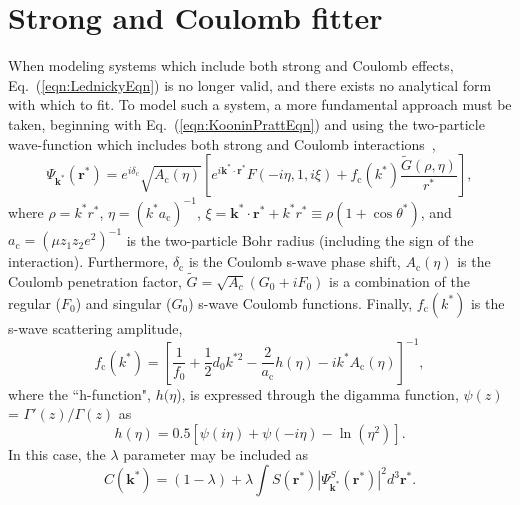 \documentclass[ALICE,manyauthors]{cernphprep}
\begin{document}
\section{Strong and Coulomb fitter}
\label{App:CoulombFitter}

When modeling systems which include both strong and Coulomb effects, Eq.~{\color{blue}(}\ref{eqn:LednickyEqn}{\color{blue})} is no longer valid, and there exists no analytical form with which to fit.
To model such a system, a more fundamental approach must be taken, beginning with Eq.~{\color{blue}(}\ref{eqn:KooninPrattEqn}{\color{blue})} and using the two-particle wave-function which includes both strong and Coulomb interactions~\cite{Lednicky:2005tb},
\begin{equation}
 \Psi_{\mathbf{k^{*}}}(\mathbf{r^{*}}) = e^{i\delta_{\mathrm{c}}}\sqrt{A_{\mathrm{c}}(\eta)}[e^{i\mathbf{k^{*}} \cdot \mathbf{r^{*}}}F(-i\eta,1,i\xi) + f_{\mathrm{c}}(k^{*})\frac{\tilde{G}(\rho,\eta)}{r^{*}}],
\label{eqn:CoulombWaveFcn}
\end{equation}
where $\rho = k^{*}r^{*}$, $\eta = (k^{*}a_{\mathrm{c}})^{-1}$, $\xi = \mathbf{k^{*}} \cdot \mathbf{r^{*}} + k^{*}r^{*} \equiv \rho(1+\cos\theta^{*})$, and $a_{\mathrm{c}} = (\mu z_{1}z_{2}e^{2})^{-1}$ is the two-particle Bohr radius (including the sign of the interaction).  
Furthermore, $\delta_{\mathrm{c}}$ is the Coulomb s-wave phase shift, $A_{\mathrm{c}}(\eta)$ is the Coulomb penetration factor, $\tilde{G} = \sqrt{A_{c}}(G_{0} + iF_{0})$ is a combination of the regular ($F_{0}$) and singular ($G_{0}$) s-wave Coulomb functions.  
Finally, $f_{\mathrm{c}}(k^{*})$ is the s-wave scattering amplitude,
\begin{equation}
 f_{\mathrm{c}}(k^{*}) = \left[\frac{1}{f_{0}} + \frac{1}{2}d_{0}k^{*2} - \frac{2}{a_{\mathrm{c}}}h(\eta) - ik^{*}A_{\mathrm{c}}(\eta)\right]^{-1},
\label{eqn:CoulombScattAmp}
\end{equation}
where the ``h-function", $h(\eta$), is expressed through the digamma function, $\psi(z)$ = $\Gamma'(z)/\Gamma(z)$ as
\begin{equation}
 h(\eta) = 0.5[\psi(i\eta) + \psi(-i\eta) - \ln(\eta^{2})].
\label{eqn:LednickyHFunction}
\end{equation} 
In this case, the $\lambda$ parameter may be included as
\begin{equation}
 C(\mathbf{k^{*}}) = (1 - \lambda) + \lambda\int S(\mathbf{r^{*}})|\Psi^{S}_{\mathbf{k^{*}}}(\mathbf{r^{*}})|^{2}d^{3}\mathbf{r^{*}}.
\label{eqn:GenCfEqnwLambda}
\end{equation}
\end{document}
